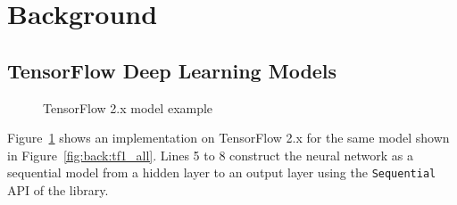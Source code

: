 \section{Background}\label{sec:background}

\subsection{TensorFlow Deep Learning Models}


\begin{figure}[ht!]
  \centering
  
  \caption{TensorFlow 2.x model example}
\label{fig:back:tf2}
\end{figure}

Figure~\ref{fig:back:tf2} shows an implementation on TensorFlow 2.x for the
same model shown in Figure~\ref{fig:back:tf1_all}.
Lines 5 to 8 construct the neural network as a sequential model from a
hidden layer to an output layer using the {\tt Sequential} API of the
library.
